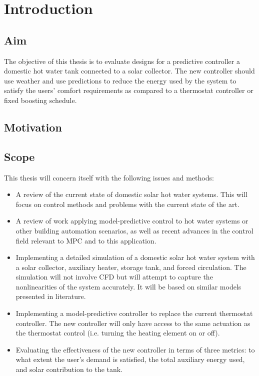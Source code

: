 \chapter{Introduction}

\section{Aim}

The objective of this thesis is to evaluate designs for a predictive controller a domestic hot water tank connected to a solar collector.
The new controller should use weather and use predictions to reduce the energy used by the system to satisfy the users' comfort requirements as compared to a thermostat controller or fixed boosting schedule.


\section{Motivation}

\section{Scope}

This thesis will concern itself with the following issues and methods:

\begin{itemize}
   \item A review of the current state of domestic solar hot water systems.
         This will focus on control methods and problems with the current state of the art.
   \item A review of work applying model-predictive control to hot water systems or other building automation scenarios, as well as recent advances in the control field relevant to MPC and to this application.
   \item Implementing a detailed simulation of a domestic solar hot water system with a solar collector, auxiliary heater, storage tank, and forced circulation.
         The simulation will not involve CFD but will attempt to capture the nonlinearities of the system accurately.
         It will be based on similar models presented in literature.
   \item Implementing a model-predictive controller to replace the current thermostat controller.
         The new controller will only have access to the same actuation as the thermostat control (i.e. turning the heating element on or off).
   \item Evaluating the effectiveness of the new controller in terms of three metrics: to what extent the user's demand is satisfied, the total auxiliary energy used, and solar contribution to the tank.
\end{itemize}

